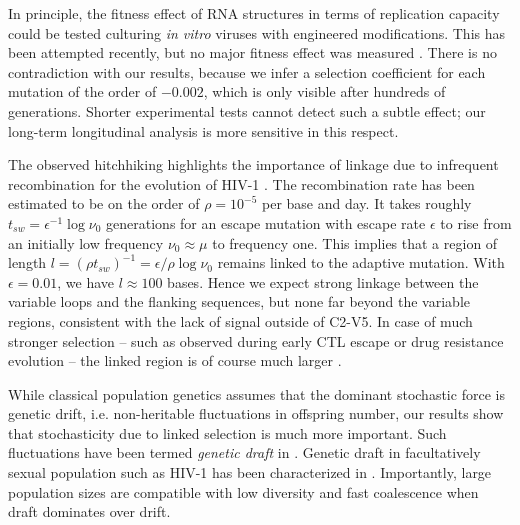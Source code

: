 \documentclass[rmp, twocolumn]{revtex4}
\newcommand{\shankaregion}{C2-V5}
\begin{document}
In principle, the fitness effect of RNA structures in terms of replication
capacity could be tested culturing \textit{in vitro} viruses with engineered
modifications. This has been attempted recently, but no major fitness effect was
measured \citep{knoepfel_role_2013}. There is no contradiction with our results,
because we infer a selection coefficient for each mutation of the order of
$-0.002$, which is only visible after hundreds of generations. Shorter
experimental tests cannot detect such a subtle effect; our long-term
longitudinal analysis is more sensitive in this respect.

The observed hitchhiking highlights the importance of linkage due to
infrequent recombination for the evolution of HIV-1
\citep{neher_recombination_2010, batorsky_estimate_2011,
josefsson_majority_2011}. The recombination rate has been estimated to be on the
order of $\rho = 10^{-5}$ per base and day. It takes roughly $t_{sw} =
\epsilon^{-1} \log \nu_0$ generations for an escape mutation with escape rate
$\epsilon$ to rise from an initially low frequency $\nu_0\approx \mu$ to frequency
one. This implies that a region of length $l = (\rho t_{sw})^{-1} = \epsilon /
\rho \log \nu_0$ remains linked to the adaptive mutation. With $\epsilon=0.01$,
we have $l\approx 100$ bases. Hence we expect strong linkage between the
variable loops and the flanking sequences, but none far beyond the variable
regions, consistent with the lack of signal outside of \shankaregion. In case of
much stronger selection -- such as observed during early CTL escape or drug
resistance evolution -- the linked region is of course much larger
\citep{nijhuis_stochastic_1998}. 

While classical population genetics assumes that the dominant stochastic force
is genetic drift, i.e. non-heritable fluctuations in offspring number, our
results show that stochasticity due to linked selection is much more important.
Such fluctuations have been termed \emph{genetic draft} in
\citet{gillespie_genetic_2000}. Genetic draft in facultatively sexual population
such as HIV-1 has been characterized in \citep{neher_genetic_2011}. Importantly,
large population sizes are compatible with low diversity and fast coalescence
when draft dominates over drift.
\end{document}
